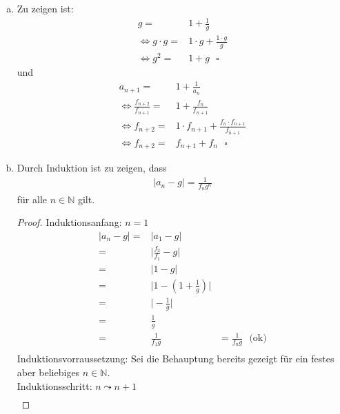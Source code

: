 \documentclass{scrreprt}
\newcommand{\NN}{\mathbb{N}}
\begin{document}
	\begin{enumerate}[(a)]
		\item
            Zu zeigen ist:
            \begin{align*}
                g = & 1 + \frac{1}{g}\\
                \Leftrightarrow g \cdot g = & 1 \cdot g + \frac{1 \cdot g}{g}\\
                \Leftrightarrow g^2 = & 1 + g~~~ \square
            \end{align*}
            und
            \begin{align*}
                a_{n+1} = & 1 + \frac{1}{a_n}\\
                \Leftrightarrow \frac{f_{n+2}}{f_{n+1}} = & 1 + \frac{f_n}{f_{n+1}}\\
                \Leftrightarrow f_{n+2} = & 1 \cdot f_{n+1} + \frac{f_n \cdot f_{n+1}}{f_{n+1}}\\
                \Leftrightarrow f_{n+2} = & f_{n+1} + f_n ~~~ \square
            \end{align*}
        \item
            Durch Induktion ist zu zeigen, dass
            \begin{align*}
                \vert a_n - g \vert = \frac{1}{f_n g^n}
            \end{align*}
            für alle $n \in \NN$ gilt.
            \begin{proof}
                Induktionsanfang: $n=1$
                \begin{align*}
                    \vert a_n - g \vert = & \vert a_1 - g \vert&\\ 
                    = & \vert \frac{f_2}{f_1} - g\vert&\\
                    = & \vert 1 - g \vert&\\
                    = & \vert 1 - (1 + \frac{1}{g}) \vert&\\
                    = & \vert - \frac{1}{g} \vert&\\
                    = & \frac{1}{g}&\\
                    = & \frac{1}{f_1 g} &= \frac{1}{f_n g} ~~~ \text{(ok)}\\
                \end{align*}
                Induktionsvorraussetzung: Sei die Behauptung bereits gezeigt für ein festes aber beliebiges $n \in \NN$.\\
                Induktionsschritt: $n \leadsto n+1$
                \begin{align*}

\end{align*}
\end{proof}
\end{enumerate}
\end{document}
